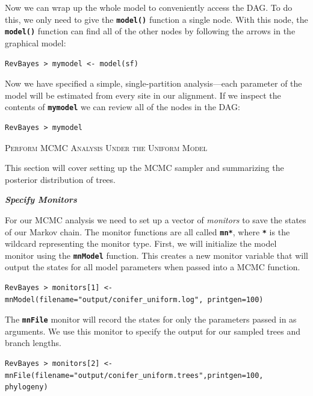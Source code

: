\documentclass[11pt]{article}
\newcommand{\cl}[1]{{\texttt{\textbf{#1}}}}
\begin{document}
Now we can wrap up the whole model to conveniently access the DAG. To do this, we only need to give the \cl{model()} function a single node. With this node, the \cl{model()} function can find all of the other nodes by following the arrows in the graphical model:
{\tt \begin{snugshade*}
\begin{lstlisting}
RevBayes > mymodel <- model(sf)
\end{lstlisting}
\end{snugshade*}}

Now we have specified a simple, single-partition analysis---each parameter of the model will be estimated from every site in our alignment.
If we inspect the contents of \cl{mymodel} we can review all of the nodes in the DAG:
{\tt \begin{snugshade*}
\begin{lstlisting}
RevBayes > mymodel
\end{lstlisting}
\end{snugshade*}}

\bigskip
{\large \textcolor{mycol}{\textsc{Perform MCMC Analysis Under the Uniform Model}}}

This section will cover setting up the MCMC sampler and summarizing the posterior distribution of trees. 

\textbf{\textit{Specify Monitors}}

For our MCMC analysis we need to set up a vector of \textit{monitors} to save the states of our Markov chain. 
The monitor functions are all called \cl{mn*}, where \cl{*} is the wildcard representing the monitor type.
First, we will initialize the model monitor using the \cl{mnModel} function. This creates a new monitor variable that will output the states for all model parameters when passed into a MCMC function. 
{\tt \begin{snugshade*}
\begin{lstlisting}
RevBayes > monitors[1] <- mnModel(filename="output/conifer_uniform.log", printgen=100)
\end{lstlisting}
\end{snugshade*}}

The \cl{mnFile} monitor will record the states for only the parameters passed in as arguments. We use this monitor to specify the output for our sampled trees and branch lengths.

{\tt \begin{snugshade*}
\begin{lstlisting}
RevBayes > monitors[2] <- mnFile(filename="output/conifer_uniform.trees",printgen=100, phylogeny)
\end{lstlisting}
\end{snugshade*}}
\end{document}
